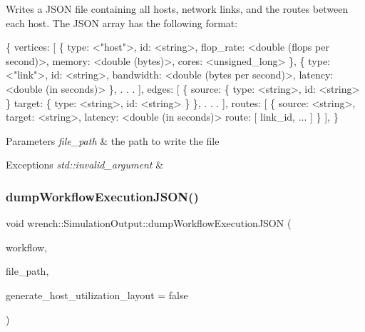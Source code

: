 Writes a J\+S\+ON file containing all hosts, network links, and the routes between each host.  The J\+S\+ON array has the following format\+: 


\begin{DoxyPre}
\{
   vertices: [
       \{
           type: <"host">,
           id: <string>,
           flop\_rate: <double (flops per second)>,
           memory: <double (bytes)>,
           cores: <unsigned\_long>
       \},
       \{
           type: <"link">,
           id: <string>,
           bandwidth: <double (bytes per second)>,
           latency: <double (in seconds)>
       \}, . . .
   ],
   edges: [
       \{
           source: \{
               type: <string>,
               id: <string>
           \}
           target: \{
               type: <string>,
               id: <string>
          \}
       \}, . . .
   ],
  routes: [
      \{
          source: <string>,
          target: <string>,
          latency: <double (in seconds)>
          route: [
              link\_id, ...
          ]
      \}
  ],
\}
\end{DoxyPre}



\begin{DoxyParams}{Parameters}
{\em file\+\_\+path} & the path to write the file\\
\hline
\end{DoxyParams}

\begin{DoxyExceptions}{Exceptions}
{\em std\+::invalid\+\_\+argument} & \\
\hline
\end{DoxyExceptions}
\mbox{\label{classwrench_1_1_simulation_output_a7a85709b2581c90b53c217e6805cf56c}} 
\subsubsection{\texorpdfstring{dump\+Workflow\+Execution\+J\+S\+O\+N()}{dumpWorkflowExecutionJSON()}}
{\footnotesize\ttfamily void wrench\+::\+Simulation\+Output\+::dump\+Workflow\+Execution\+J\+S\+ON (\begin{DoxyParamCaption}\item[{\hyperlink{classwrench_1_1_workflow}{Workflow} $\ast$}]{workflow,  }\item[{std\+::string}]{file\+\_\+path,  }\item[{bool}]{generate\+\_\+host\+\_\+utilization\+\_\+layout = {\ttfamily false} }\end{DoxyParamCaption})}



